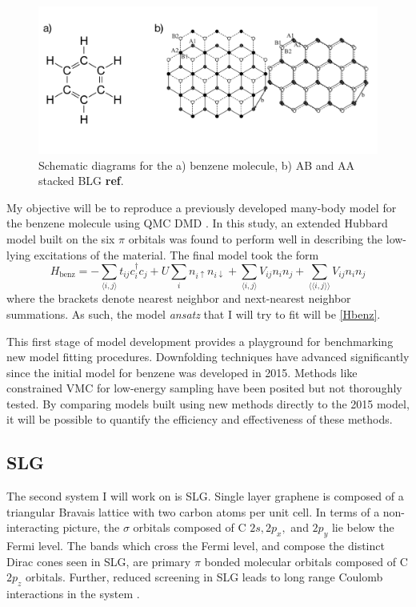 \documentclass[12pt]{article}
\begin{document}
\begin{figure}
\centering
\includegraphics[width=1.0\linewidth]{./figs/proposed.pdf}
\caption{Schematic diagrams for the a) benzene molecule, b) AB and AA stacked BLG \textbf{ref}.}
\label{fig:proposed}
\end{figure}

My objective will be to reproduce a previously developed many-body model for the benzene molecule using QMC DMD \cite{Wagner2015}.
In this study, an extended Hubbard model built on the six $\pi$ orbitals was found to perform well in describing the low-lying excitations of the material.
The final model took the form 
\begin{equation}
H_\text{benz} = -\sum_{\langle i,j \rangle} t_{ij}c_i^\dagger c_j + U \sum_i n_{i\uparrow}n_{i\downarrow}  + \sum_{\langle i,j \rangle}V_{ij} n_i n_j + \sum_{\langle \langle i,j \rangle\rangle}V_{ij} n_i n_j
\label{Hbenz}
\end{equation}
where the brackets denote nearest neighbor and next-nearest neighbor summations.
As such, the model \textit{ansatz} that I will try to fit will be \eqref{Hbenz}.

This first stage of model development provides a playground for benchmarking new model fitting procedures.
Downfolding techniques have advanced significantly since the initial model for benzene was developed in 2015.
Methods like constrained VMC for low-energy sampling have been posited but not thoroughly tested.
By comparing models built using new methods directly to the 2015 model, it will be possible to quantify the efficiency and effectiveness of these methods.

\subsection{SLG}
The second system I will work on is SLG.
Single layer graphene is composed of a triangular Bravais lattice with two carbon atoms per unit cell.
In terms of a non-interacting picture, the $\sigma$ orbitals composed of C $2s, 2p_x,$ and $2p_y$ lie below the Fermi level.
The bands which cross the Fermi level, and compose the distinct Dirac cones seen in SLG, are primary $\pi$ bonded molecular orbitals composed of C $2p_z$ orbitals.
Further, reduced screening in SLG leads to long range Coulomb interactions in the system \cite{Elias2012, Yu2013}.
\end{document}

